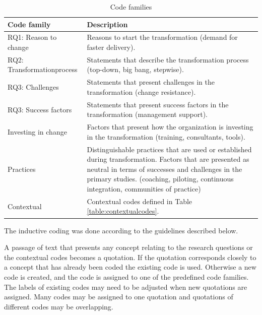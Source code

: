 \documentclass[preprint,authoryear,12pt]{elsarticle}
\begin{document}
\begin{table}[h]
    \begin{tabular}{ p{} p{} }
        \toprule
        Code family          &  Description
        \\
        \midrule

        RQ1: Reason to change &
        Reasons to start the transformation (demand for faster delivery). \\

		RQ2: Transformation\newline process &
		Statements that describe the transformation process (top-down, big bang,
		stepwise). \\

		RQ3: Challenges &
		Statements that present challenges in the transformation (change resistance).
		\\

		RQ3: Success factors &
		Statements that present success factors in the transformation (management
		support).
		\\

		Investing in change  &
		Factors that present how the organization is investing in the
		transformation (training, consultants, tools). \\

		Practices &
		Distinguishable practices that are used or established during transformation.
		Factors that are presented as neutral in terms of successes and challenges
		in the primary studies.
		(coaching, piloting, continuous integration, communities of practice) \\
		
		Contextual &
		Contextual codes defined in Table \ref{table:contextualcodes}. \\
		
        \bottomrule
    \end{tabular}
    \caption{Code families}
    \label{table:codefamilies}
\end{table}

The inductive coding was done according to the guidelines described below.

A passage of text that presents any concept relating to the research questions
or the contextual codes becomes a quotation. If the quotation corresponds
closely to a concept that has already been coded the existing code is used.
Otherwise a new code is created, and the code is assigned to one of the
predefined code families. The labels of existing codes may need to be adjusted
when new quotations are assigned. Many codes may be assigned to one quotation
and quotations of different codes may be overlapping.
\end{document}
